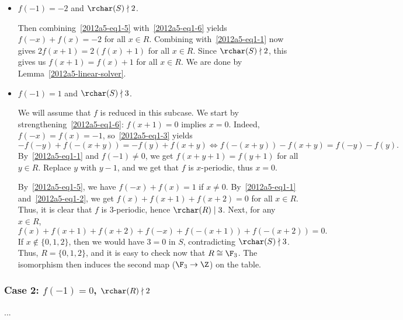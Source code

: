 \begin{itemize}

    \item
    $f(-1) = -2$ and $\rchar(S) \nmid 2$.
    
    Then combining~\eqref{2012a5-eq1-5} with~\eqref{2012a5-eq1-6} yields $f(-x) + f(x) = -2$ for all $x \in R$.
    Combining with~\eqref{2012a5-eq1-1} now gives $2 f(x + 1) = 2 (f(x) + 1)$ for all $x \in R$.
    Since $\rchar(S) \nmid 2$, this gives us $f(x + 1) = f(x) + 1$ for all $x \in R$.
    We are done by Lemma~\ref{2012a5-linear-solver}.


    
    \item
    $f(-1) = 1$ and $\rchar(S) \nmid 3$.

    We will assume that $f$ is reduced in this subcase.
    We start by strengthening~\eqref{2012a5-eq1-6}: $f(x + 1) = 0$ implies $x = 0$.
    Indeed, $f(-x) = f(x) = -1$, so~\eqref{2012a5-eq1-3} yields
    \[ -f(-y) + f(-(x + y)) = -f(y) + f(x + y) \iff f(-(x + y)) - f(x + y) = f(-y) - f(y). \]
    By~\eqref{2012a5-eq1-1} and $f(-1) \neq 0$, we get $f(x + y + 1) = f(y + 1)$ for all $y \in R$.
    Replace $y$ with $y - 1$, and we get that $f$ is $x$-periodic, thus $x = 0$.

    By~\eqref{2012a5-eq1-5}, we have $f(-x) + f(x) = 1$ if $x \neq 0$.
    By~\eqref{2012a5-eq1-1} and~\eqref{2012a5-eq1-2}, we get $f(x) + f(x + 1) + f(x + 2) = 0$ for all $x \in R$.
    Thus, it is clear that $f$ is $3$-periodic, hence $\rchar(R) \mid 3$.
    Next, for any $x \in R$,
    \[ f(x) + f(x + 1) + f(x + 2) + f(-x) + f(-(x + 1)) + f(-(x + 2)) = 0. \]
    If $x \notin \{0, 1, 2\}$, then we would have $3 = 0$ in $S$, contradicting $\rchar(S) \nmid 3$.
    Thus, $R = \{0, 1, 2\}$, and it is easy to check now that $R \cong \F_3$.
    The isomorphism then induces the second map ($\F_3 \to \Z$) on the table.

\end{itemize}




\newpage
\subsubsection*{Case 2: $f(-1) = 0$, $\rchar(R) \nmid 2$}

...


